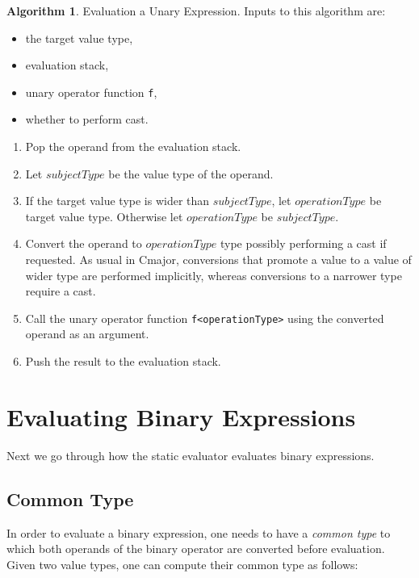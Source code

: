 \documentclass[a4paper,oneside,11pt]{book}
\theoremstyle{definition}
\newtheorem{algo}{Algorithm}[section]
\begin{document}
\begin{algo}\label{unaryexpreval} Evaluation a Unary Expression.
Inputs to this algorithm are:
\begin{itemize}
\item
the target value type,
\item
evaluation stack,
\item
unary operator function \verb|f|,
\item
whether to perform cast.
\end{itemize}

\begin{enumerate}
\item
Pop the operand from the evaluation stack.
\item
Let $subjectType$ be the value type of the operand.
\item
If the target value type is wider than $subjectType$, let $operationType$ be target value type.
Otherwise let $operationType$ be $subjectType$.
\item
Convert the operand to $operationType$ type possibly performing a cast if requested.
As usual in Cmajor, conversions that promote a value to a value of wider type are performed implicitly,
whereas conversions to a narrower type require a cast.
\item
Call the unary operator function \verb|f<operationType>| using the converted operand as an argument.
\item
Push the result to the evaluation stack.
\end{enumerate}
\end{algo}

\section{Evaluating Binary Expressions}

Next we go through how the static evaluator evaluates binary expressions.

\subsection{Common Type}

In order to evaluate a binary expression, one needs to have a \emph{common type} to which both operands of the binary operator are converted
before evaluation. Given two value types, one can compute their common type as follows:
\end{document}
